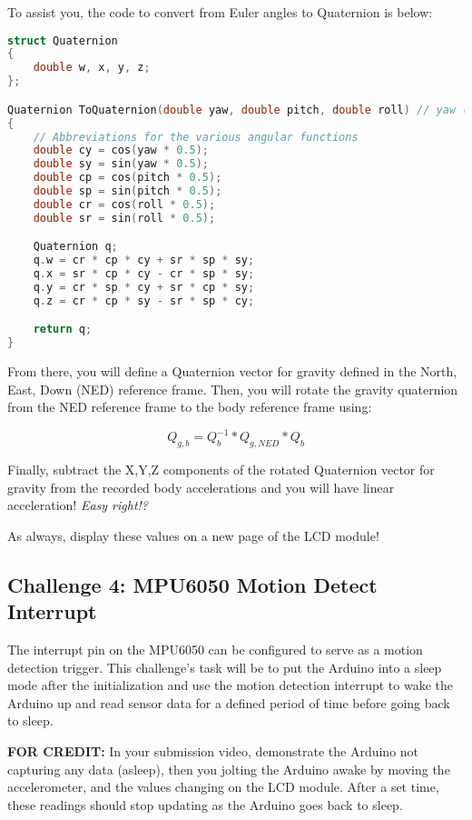     To assist you, the code to convert from Euler angles to Quaternion is below:
    \begin{lstlisting}[linewidth=1.5\textwidth, language=C++]
struct Quaternion
{
    double w, x, y, z;
};

Quaternion ToQuaternion(double yaw, double pitch, double roll) // yaw (Z), pitch (Y), roll (X)
{
    // Abbreviations for the various angular functions
    double cy = cos(yaw * 0.5);
    double sy = sin(yaw * 0.5);
    double cp = cos(pitch * 0.5);
    double sp = sin(pitch * 0.5);
    double cr = cos(roll * 0.5);
    double sr = sin(roll * 0.5);

    Quaternion q;
    q.w = cr * cp * cy + sr * sp * sy;
    q.x = sr * cp * cy - cr * sp * sy;
    q.y = cr * sp * cy + sr * cp * sy;
    q.z = cr * cp * sy - sr * sp * cy;

    return q;
}
    \end{lstlisting}

    From there, you will define a Quaternion vector for gravity defined in the North, East, Down (NED) reference frame.
    Then, you will rotate the gravity quaternion from the NED reference frame to the body reference frame using:
    
    \begin{equation*}
        Q_{g,b} = Q_b^{-1} * Q_{g,NED} * Q_b
    \end{equation*}

    Finally, subtract the X,Y,Z components of the rotated Quaternion vector for gravity from the recorded body accelerations and you will have linear acceleration! \emph{Easy right!?}
    
    As always, display these values on a new page of the LCD module!
    
    \subsection*{Challenge 4: MPU6050 Motion Detect Interrupt}
    The interrupt pin on the MPU6050 can be configured to serve as a motion detection trigger.
    This challenge's task will be to put the Arduino into a sleep mode after the initialization and use the motion detection interrupt to wake the Arduino up and read sensor data for a defined period of time before going back to sleep.

    \textbf{FOR CREDIT:} In your submission video, demonstrate the Arduino not capturing any data (asleep), then you jolting the Arduino awake by moving the accelerometer, and the values changing on the LCD module.
    After a set time, these readings should stop updating as the Arduino goes back to sleep.
